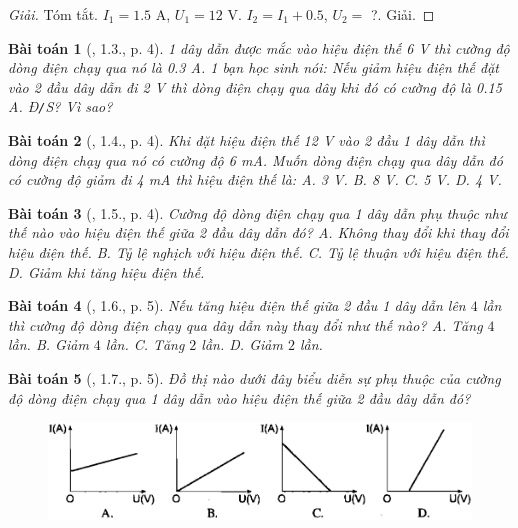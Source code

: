 \documentclass{article}
\newtheorem{baitoan}{Bài toán}
\begin{document}
\begin{proof}[Giải]
	\textsf{Tóm tắt.} $I_1 = 1.5$ A, $U_1 = 12$ V. $I_2 = I_1 + 0.5$, $U_2 =$ ?. \textsf{Giải.} 
\end{proof}

\begin{baitoan}[\cite{SBT_Vat_Ly_9}, 1.3., p. 4]
	1 dây dẫn được mắc vào hiệu điện thế \emph{6 V} thì cường độ dòng điện chạy qua nó là \emph{0.3 A}. 1 bạn học sinh nói: Nếu giảm hiệu điện thế đặt vào 2 đầu dây dẫn đi \emph{2 V} thì dòng điện chạy qua dây khi đó có cường độ là \emph{0.15 A}. \emph{Đ\texttt{/}S?} Vì sao?
\end{baitoan}

\begin{baitoan}[\cite{SBT_Vat_Ly_9}, 1.4., p. 4]
	Khi đặt hiệu điện thế \emph{12 V} vào 2 đầu 1 dây dẫn thì dòng điện chạy qua nó có cường độ \emph{6 mA}. Muốn dòng điện chạy qua dây dẫn đó có cường độ giảm đi \emph{4 mA} thì hiệu điện thế là: {\sf A.} \emph{3 V}. {\sf B.} \emph{8 V}. {\sf C.} \emph{5 V}. {\sf D.} \emph{4 V}.
\end{baitoan}

\begin{baitoan}[\cite{SBT_Vat_Ly_9}, 1.5., p. 4]
	Cường độ dòng điện chạy qua 1 dây dẫn phụ thuộc như thế nào vào hiệu điện thế giữa 2 đầu dây dẫn đó? {\sf A.} Không thay đổi khi thay đổi hiệu điện thế. {\sf B.} Tỷ lệ nghịch với hiệu điện thế. {\sf C.} Tỷ lệ thuận với hiệu điện thế. {\sf D.} Giảm khi tăng hiệu điện thế.
\end{baitoan}

\begin{baitoan}[\cite{SBT_Vat_Ly_9}, 1.6., p. 5]
	Nếu tăng hiệu điện thế giữa 2 đầu 1 dây dẫn lên $4$ lần thì cường độ dòng điện chạy qua dây dẫn này thay đổi như thế nào? {\sf A.} Tăng $4$ lần. {\sf B.} Giảm $4$ lần. {\sf C.} Tăng $2$ lần. {\sf D.} Giảm $2$ lần.
\end{baitoan}

\begin{baitoan}[\cite{SBT_Vat_Ly_9}, 1.7., p. 5]
	Đồ thị nào dưới đây biểu diễn sự phụ thuộc của cường độ dòng điện chạy qua 1 dây dẫn vào hiệu điện thế giữa 2 đầu dây dẫn đó?
	\begin{figure}[H]
		\centering
		\includegraphics[scale=0.25]{SBT_1.1}
	\end{figure}
\end{baitoan}
\end{document}
